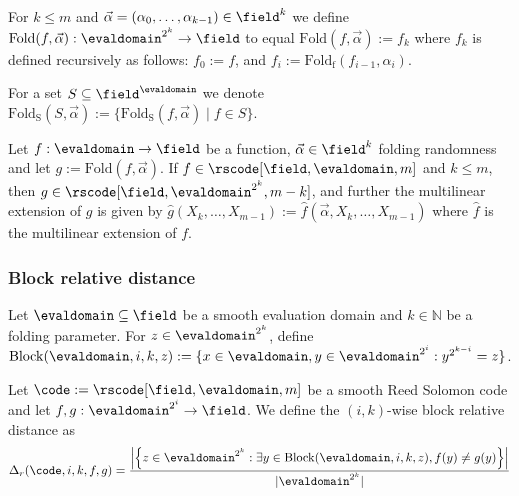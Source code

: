 \begin{definition}\label{def:fold_k}
    For $k \leq m$ and $\vec{\alpha} = (\alpha_0, \ldots, \alpha_{k-1}) \in \field^k$ we define $\mathrm{Fold}(f, \vec{\alpha}) : \evaldomain^{2^k} \to \field$ to equal $\mathrm{Fold}(f, \vec{\alpha}) := f_k$ where $f_k$ is defined recursively as follows: $f_0 := f$, and $f_i := \mathrm{Fold_f}(f_{i-1}, \alpha_i)$. 
\end{definition}

\begin{definition}\label{def:fold_k_set}
    For a set $S \subseteq \field^{\evaldomain}$ we denote $\mathrm{Fold_{S}}(S, \vec{\alpha}) := \{\mathrm{Fold_{S}}(f, \vec{\alpha}) \mid f \in S\}$.
\end{definition}

\begin{lemma}\label{lemma:fold_fg}
    Let $f : \evaldomain \to \field$ be a function, $\vec{\alpha} \in \field^k$ folding randomness and let $g := \mathrm{Fold}(f, \vec{\alpha})$. If $f \in \rscode[\field, \evaldomain, m]$ and $k \leq m$, then $g \in \rscode[\field, \evaldomain^{2^k}, m - k]$, and further the multilinear extension of $g$ is given by $\hat{g}(X_k, \ldots, X_{m-1}) := \hat{f}(\vec{\alpha}, X_k, \ldots, X_{m-1})$ where $\hat{f}$ is the multilinear extension of $f$.
\end{lemma}

\subsubsection{Block relative distance}

\begin{definition}\label{def:block}
    Let $\evaldomain \subseteq \field$ be a smooth evaluation domain and $k \in \mathbb{N}$ be a folding parameter. For $z \in \evaldomain^{2^k}$, define $\mathrm{Block}(\evaldomain, i, k, z) := \{ x \in \evaldomain, y \in \evaldomain^{2^i} : y^{2^{k-i}} = z \}$.
\end{definition}

\begin{definition}\label{def:block_rel_distance}
    Let $\code := \rscode[\field, \evaldomain, m]$ be a smooth Reed Solomon code and let $f, g : \evaldomain^{2^i} \to \field$. We define the $(i,k)$-wise block relative distance as
    \[
    \Delta_{r}(\code, i, k, f, g) = \frac{ \left| \left\{ z \in \evaldomain^{2^k} : \exists y \in \mathrm{Block}(\evaldomain, i, k, z), f(y) \neq g(y) \right\} \right| }{ |\evaldomain^{2^k}| }
    \]
\end{definition}

